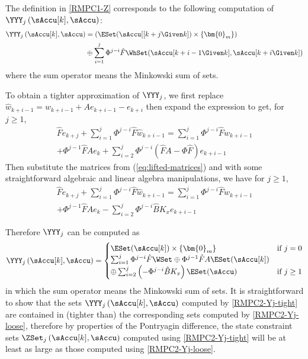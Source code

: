 The definition in \eqref{RMPC1-Z}
corresponds to the following computation of $\YYY_{j}\left(\sAccu[k],\sAccu\right)$:  \begin{equation}
\begin{split}
\YYY_{j}\left(\sAccu[k],\sAccu\right)&=\left(\ESet(\sAccu[[k+j\Given k])\times\left\{ \bm{0}_{m}\right\} \right) \\
&\oplus\sum_{i=1}^{j}\Phi^{j-i}\hat{F}\WhSet(\sAccu[k+i-1\Given k],\sAccu[k+i\Given k])\label{eq:RMPC2-Yj-loose}
\end{split}
\end{equation}
where the sum operator means the Minkowski sum of sets.

To obtain a tighter approximation of $\YYY_{j}$, we first replace
$\hat{w}_{k+i-1}=w_{k+i-1}+Ae_{k+i-1}-e_{k+i}$ then expand the expression
to get, for $j\geq1$, \begin{equation}
\begin{split}
\hat{F}e_{k+j}+\sum_{i=1}^{j}\Phi^{j-i}\hat{F}\hat{w}_{k+i-1}=\sum_{i=1}^{j}\Phi^{j-i}\hat{F}w_{k+i-1} \\
+\Phi^{j-1}\hat{F}Ae_{k}+\sum_{i=2}^{j}\Phi^{j-i}\left(\hat{F}A-\Phi\hat{F}\right)e_{k+i-1}
\end{split}
\end{equation}
Then substitute the matrices from (\ref{eq:lifted-matrices}) and
with some straightforward algebraic and linear algebra manipulations,
we have for $j\geq1$, \begin{equation} 
\begin{split}
\hat{F}e_{k+j}+\sum_{i=1}^{j}\Phi^{j-i}\hat{F}\hat{w}_{k+i-1}=\sum_{i=1}^{j}\Phi^{j-i}\hat{F}w_{k+i-1} \\ 
+\Phi^{j-1}\hat{F}Ae_{k}-\sum_{i=2}^{j}\Phi^{j-i}\hat{B}K_{x}e_{k+i-1}
\end{split}
\end{equation}

 Therefore $\YYY_{j}$ can be computed as
{\small 
\begin{equation}
\YYY_{j}\left(\sAccu[k],\sAccu\right)=\begin{cases}
\ESet(\sAccu[k])\times\left\{ \bm{0}_{m}\right\}  & \text{\text{\text{if \ensuremath{j=0}}}}\\
\sum_{i=1}^{j}\Phi^{j-i}\hat{F}\WSet\oplus\Phi^{j-1}\hat{F}A\ESet(\sAccu[k]) \\ 
\oplus\sum_{i=2}^{j}\left(-\Phi^{j-i}\hat{B}K_{x}\right)\ESet(\sAccu) & \text{if \ensuremath{j\geq1}}
\end{cases}\label{eq:RMPC2-Yj-tight}
\end{equation}}
 in which the sum operator means the Minkowski sum of sets. It is
straightforward to show that the sets $\YYY_{j}\left(\sAccu[k],\sAccu\right)$
computed by \eqref{RMPC2-Yj-tight} are contained in (\ie tighter
than) the corresponding sets computed by \eqref{RMPC2-Yj-loose},
therefore by properties of the Pontryagin difference, the state constraint
sets $\ZSet_{j}\left(\sAccu[k],\sAccu\right)$ computed using \eqref{RMPC2-Yj-tight}
will be at least as large as %
 those computed using \eqref{RMPC2-Yj-loose}.